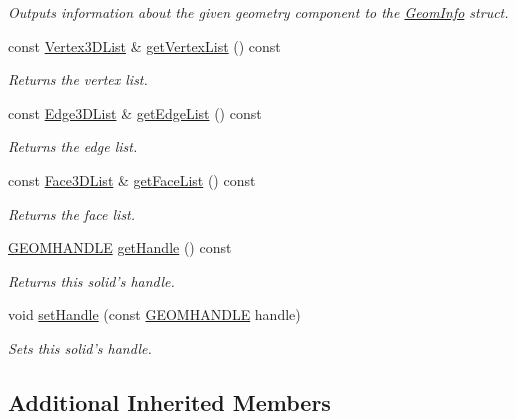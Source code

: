 \begin{DoxyCompactItemize}
\begin{DoxyCompactList}\small\item\em Outputs information about the given geometry component to the \hyperlink{struct_geom_info}{Geom\-Info} struct. \end{DoxyCompactList}\item 
const \hyperlink{class_solid3_d_acaa1c40fc6c74ee5c77e64baa3a672b1}{Vertex3\-D\-List} \& \hyperlink{class_solid3_d_aa97775f007b84f89802d1f87b24665a0}{get\-Vertex\-List} () const 
\begin{DoxyCompactList}\small\item\em Returns the vertex list. \end{DoxyCompactList}\item 
const \hyperlink{class_solid3_d_ac9b57b2279aeedb1dc657ac13271727b}{Edge3\-D\-List} \& \hyperlink{class_solid3_d_ab0937f1a2d79a4ae72fcafb7b9f4ab7d}{get\-Edge\-List} () const 
\begin{DoxyCompactList}\small\item\em Returns the edge list. \end{DoxyCompactList}\item 
const \hyperlink{class_solid3_d_afd4862e0f4b30967e6f0cb2013ccc084}{Face3\-D\-List} \& \hyperlink{class_solid3_d_a17968c6a8e59d14268240ff1548cc51d}{get\-Face\-List} () const 
\begin{DoxyCompactList}\small\item\em Returns the face list. \end{DoxyCompactList}\item 
\hyperlink{vertex_8h_a72202e57358ed73cd212e9a2eaf39aeb}{G\-E\-O\-M\-H\-A\-N\-D\-L\-E} \hyperlink{class_solid3_d_ac2fda07777d7c7a856add07ceb24c395}{get\-Handle} () const 
\begin{DoxyCompactList}\small\item\em Returns this solid's handle. \end{DoxyCompactList}\item 
void \hyperlink{class_solid3_d_ab12674813ab277a7c4dac092367da6cd}{set\-Handle} (const \hyperlink{vertex_8h_a72202e57358ed73cd212e9a2eaf39aeb}{G\-E\-O\-M\-H\-A\-N\-D\-L\-E} handle)
\begin{DoxyCompactList}\small\item\em Sets this solid's handle. \end{DoxyCompactList}\end{DoxyCompactItemize}
\subsection*{Additional Inherited Members}


